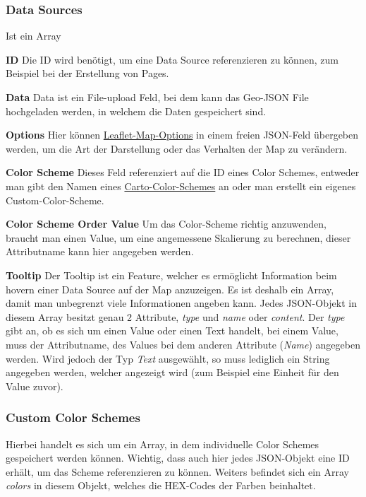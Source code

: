 \subsubsection{Data Sources}
Ist ein Array

\textbf{ID}
Die ID wird benötigt, um eine Data Source referenzieren zu können, zum Beispiel bei der Erstellung von Pages.

\textbf{Data}
Data ist ein File-upload Feld, bei dem kann das Geo-JSON File hochgeladen werden, in welchem die Daten gespeichert sind.

\textbf{Options}
Hier können \href{https://leafletjs.com/SlavaUkraini/reference.html#map-option}{Leaflet-Map-Options} in einem freien JSON-Feld
übergeben werden, um die Art der Darstellung oder das Verhalten der Map zu verändern.

\textbf{Color Scheme}
Dieses Feld referenziert auf die ID eines Color Schemes, entweder man gibt den Namen eines
\href{https://carto.com/carto-colors/}{Carto-Color-Schemes} an oder man erstellt ein eigenes Custom-Color-Scheme.

\textbf{Color Scheme Order Value}
Um das Color-Scheme richtig anzuwenden, braucht man einen Value, um eine angemessene Skalierung zu berechnen, dieser Attributname
kann hier angegeben werden.

\textbf{Tooltip}
Der Tooltip ist ein Feature, welcher es ermöglicht Information beim hovern einer Data Source auf der Map anzuzeigen.
Es ist deshalb ein Array, damit man unbegrenzt viele Informationen angeben kann.
Jedes JSON-Objekt in diesem Array besitzt genau 2 Attribute, \emph{type} und \emph{name} oder \emph{content}.
Der \emph{type} gibt an, ob es sich um einen Value oder einen Text handelt, bei einem Value, muss der Attributname, des
Values bei dem anderen Attribute (\emph{Name}) angegeben werden.
Wird jedoch der Typ \emph{Text} ausgewählt, so muss lediglich ein String angegeben werden, welcher angezeigt wird (zum Beispiel
eine Einheit für den Value zuvor).

\subsubsection{Custom Color Schemes}
Hierbei handelt es sich um ein Array, in dem individuelle Color Schemes gespeichert werden können.
Wichtig, dass auch hier jedes JSON-Objekt eine ID erhält, um das Scheme referenzieren zu können.
Weiters befindet sich ein Array \emph{colors} in diesem Objekt, welches die HEX-Codes der Farben beinhaltet.

